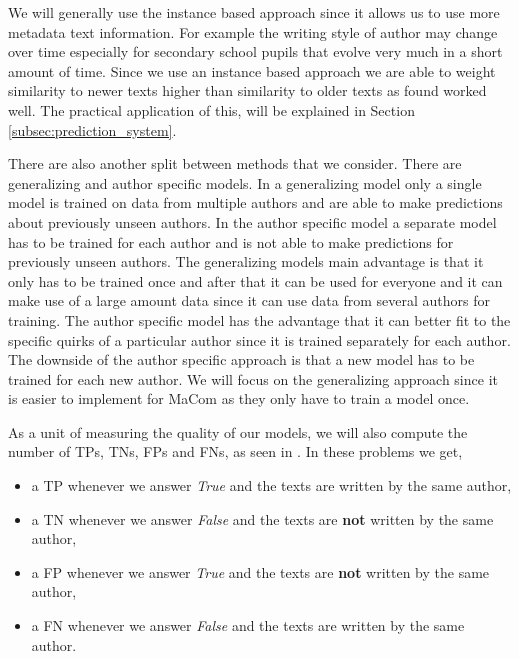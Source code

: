 We will generally use the instance based approach since it allows us to use
more metadata text information. For example the writing style of author may
change over time especially for secondary school pupils that evolve very much
in a short amount of time. Since we use an instance based approach we are able
to weight similarity to newer texts higher than similarity to older texts as
\citet{hansen2014} found worked well. The practical application of this, will be
explained in Section \ref{subsec:prediction_system}.

There are also another split between methods that we consider. There are
generalizing and author specific models. In a generalizing model only a single
model is trained on data from multiple authors and are able to make predictions
about previously unseen authors. In the author specific model a separate model
has to be trained for each author and is not able to make predictions for
previously unseen authors. The generalizing models main advantage is that it
only has to be trained once and after that it can be used for everyone and it
can make use of a large amount data since it can use data from several authors
for training. The author specific model has the advantage that it can better fit
to the specific quirks of a particular author since it is trained separately
for each author. The downside of the author specific approach is that a new
model has to be trained for each new author. We will focus on the generalizing
approach since it is easier to implement for MaCom as they only have to train a
model once.

As a unit of measuring the quality of our models, we will also compute the
number of \glspl{TP}, \glspl{TN}, \glspl{FP} and \glspl{FN}, as seen in
\citet{US}. In these problems we get,

\begin{itemize}
    \item a \gls{TP} whenever we answer \textit{True} and the texts are written
        by the same author,
    \item a \gls{TN} whenever we answer \textit{False} and the texts are
        \textbf{not} written by the same author,
    \item a \gls{FP} whenever we answer \textit{True} and the texts are
        \textbf{not} written by the same author,
    \item a \gls{FN} whenever we answer \textit{False} and the texts are written
        by the same author.
\end{itemize}

